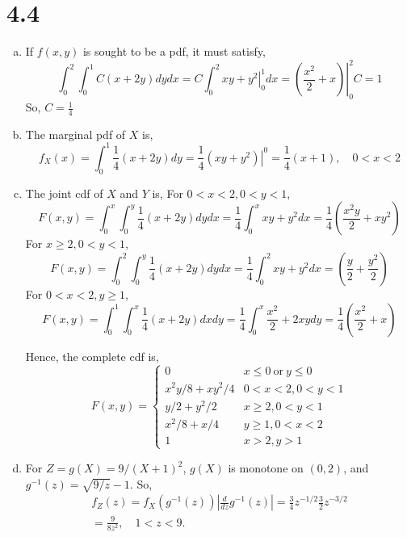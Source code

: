 \documentclass[letterpaper]{article}
\begin{document}
    \section*{4.4}
    \begin{enumerate}[(a)]
    \item
    If $f(x, y)$ is sought to be a pdf, it must satisfy,
    \[
    \int_0^2 \int_0^1 C(x+2y) dydx = C \int_0^2 \left. xy+y^2 \right|^1_0 dx = \left. (\frac{x^2}{2} + x) \right|^2_0 C = 1
    \]
    So, $C=\frac{1}{4}$

    \item The marginal pdf of $X$ is,
    \[
    f_X(x) = \int_0^1 \frac{1}{4} (x+2y) dy = \frac{1}{4} \left. (xy + y^2) \right|^0 = \frac{1}{4} (x+1), \quad 0 < x < 2
    \]
    \item The joint cdf of $X$ and $Y$ is,
    For $0 < x < 2, 0 < y < 1$,
    \[
    F(x, y) = \int_0^x \int_0^y \frac{1}{4} (x+2y) dy dx = \frac{1}{4} \int_0^x xy + y^2 dx = \frac{1}{4}\left( \frac{x^2y}{2} + xy^2\right)
    \]
    For $x \ge 2, 0 < y < 1$,
    \[
    F(x, y) = \int_0^2 \int_0^y \frac{1}{4} (x+2y) dy dx = \frac{1}{4} \int_0^2 xy + y^2 dx = \left( \frac{y}{2} + \frac{y^2}{2}\right)
    \]
    For $0 < x < 2, y \ge 1$,
    \[
    F(x, y) = \int_0^1 \int_0^x \frac{1}{4} (x+2y) dx dy = \frac{1}{4} \int_0^x \frac{x^2}{2} + 2xy dy = \frac{1}{4}\left( \frac{x^2}{2} + x\right)
    \]

    Hence, the complete cdf is,
    \[
    F(x,y) = \begin{cases}
    0 & x \le 0 ~\text{or}~ y \le 0 \\
    x^2y/8 + xy^2/4 & 0 < x < 2, 0 < y < 1 \\
    y/2 + y^2/2 & x \ge 2, 0 < y < 1 \\
    x^2/8 + x/4 & y \ge 1, 0 < x < 2\\
    1 & x > 2, y > 1
    \end{cases}
    \]
    \item 
    For $Z = g(X) = 9/(X+1)^2$, $g(X)$ is monotone on $(0,2)$, and $g^{-1}(z) = \sqrt{9/z} - 1$.
    So, 
    \begin{eqnarray*}
    f_Z(z) = f_X(g^{-1}(z)) \left| \frac{d}{dz} g^{-1}(z) \right| = \frac{3}{4} z^{-1/2} \frac{3}{2} z^{-3/2} \\
    = \frac{9}{8z^2}, \quad 1 < z < 9.
    \end{eqnarray*}

    \end{enumerate}
\end{document}
